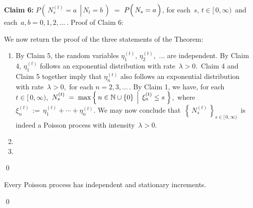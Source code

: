 \vskip 0.5cm
\noindent
\textbf{Claim 6:}\quad
$P\!\left(\,\left.N^{(t)}_{s} = a \;\,\right\vert\, N_{t} = b\,\right)$\;
$=$
\;$P\!\left(\,N_{s} \overset{{\color{white}1}}{=} a \,\right)$,\;\;
for each \,$s,\, t \in [\,0,\infty)$\, and each \,$a, b = 0, 1, 2, \ldots$\,.
\vskip 0.2cm
\noindent
Proof of Claim 6:\quad


\vskip 0.5cm
\noindent
We now return the proof of the three statements of the Theorem:
\begin{enumerate}
\item
	By Claim 5, the random variables
	\;$\eta^{(t)}_{1}$, $\eta^{(t)}_{2}$, \,$\ldots$\;
	are independent.
	By Claim 4, \;$\eta^{(t)}_{1}$\; follows an exponential distribution with rate \,$\lambda > 0$.\,
	Claim 4 and Claim 5 together imply that \;$\eta^{(t)}_{n}$\;
	also follows an exponential distribution with rate \,$\lambda > 0$,\,
	for each $n = 2, 3, \ldots$\,.
	By Claim 1, we have, for each \,$t \in [\,0,\infty)$,
	\,$N^{(t)}_{s} \; = \; \max\left\{\,n\in\mathbb{N}\cup\{0\}\;\left\vert\;\,\xi^{(t)}_{n} \leq s\right.\,\right\}$,\,
	where \,$\xi^{(t)}_{n} \,:=\, \eta^{(t)}_{1} + \cdots + \eta^{(t)}_{n}$.
	We may now conclude that
	\,$\left\{\,N^{(t)}_{s}\,\right\}_{s\in[\,0,\infty)}$\, is indeed a Poisson process
	with intensity \,$\lambda > 0$.
\item
	
\item
\end{enumerate}
\qed


\vskip 0.5cm
\begin{corollary}
\mbox{}
\vskip 0.15cm
\noindent
Every Poisson process has independent and stationary increments.
\end{corollary}
\proof

\qed


\renewcommand{\theenumi}{\roman{enumi}}
\renewcommand{\labelenumi}{\textnormal{(\theenumi)}$\;\;$}


